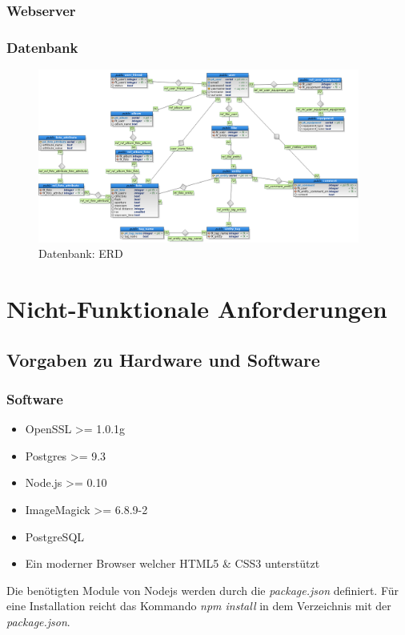 \documentclass[a4paper,bibtotoc,oneside]{scrartcl}	%
\begin{document}
		\subsubsection{Webserver}
		\subsubsection{Datenbank}

			\begin{figure}[H]
			\centering
			\includegraphics[width=400px]{Mockups/db_v1.png}
			\caption{Datenbank: ERD}
			\end{figure}

\section{Nicht-Funktionale Anforderungen}
	\subsection{Vorgaben zu Hardware und Software}
		\subsubsection{Software}
			\begin{itemize}
				\item OpenSSL >= 1.0.1g
				\item Postgres >= 9.3
				\item Node.js >= 0.10
				\item ImageMagick >= 6.8.9-2
				\item PostgreSQL
				\item Ein moderner Browser welcher HTML5 \& CSS3 unterstützt
			\end{itemize}
		
			\noindent Die benötigten Module von Nodejs werden durch die \textit{package.json} definiert.
			Für eine Installation reicht das Kommando \textit{npm install} in dem Verzeichnis mit
			der \textit{package.json}.
			
\end{document}
